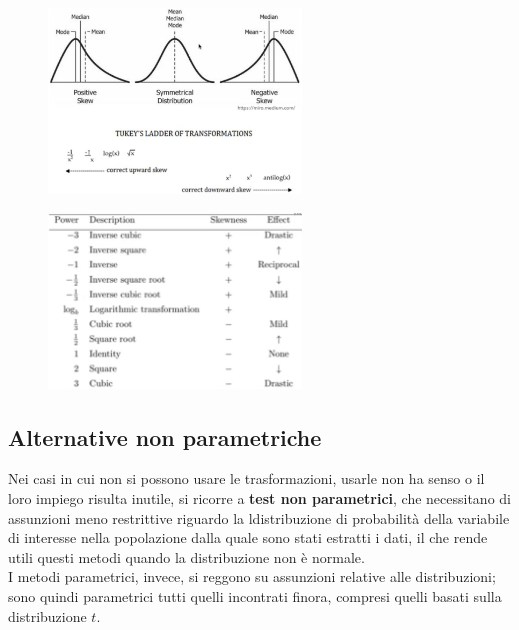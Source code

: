 \documentclass[10pt, draft]{book}
\begin{document}
\begin{figure}[H]
    \centering
    \includegraphics[width=0.6\textwidth]{figtukey}
    \caption{\small{}}
    \label{figtukey}
\end{figure}
\begin{figure}[H]
    \centering
    \includegraphics[width=0.6\textwidth]{figtukey2}
    \caption{\small{}}
    \label{figtukey2}
\end{figure}

\subsection{Alternative non parametriche}

Nei casi in cui non si possono usare le trasformazioni, usarle non ha senso o il loro impiego risulta inutile, si ricorre a \textbf{test non parametrici}, che necessitano di assunzioni meno restrittive riguardo la ldistribuzione di probabilità della variabile di interesse nella popolazione dalla quale sono stati estratti i dati, il che rende utili questi metodi quando la distribuzione non è normale.\\
I metodi parametrici, invece, si reggono su assunzioni relative alle distribuzioni; sono quindi parametrici tutti quelli incontrati finora, compresi quelli basati sulla distribuzione $t$.
\end{document}

